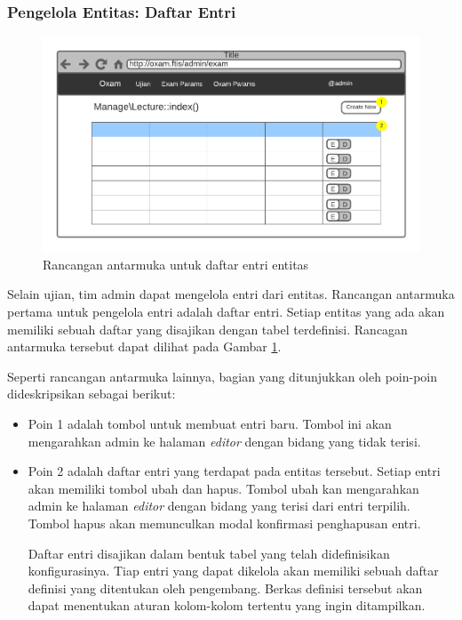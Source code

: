 \subsubsection{Pengelola Entitas: Daftar Entri}
    \begin{figure}
        \centering
        \includegraphics{Gambar/mockups/Mockup--Admin - Entity Lister.pdf}
        \caption{Rancangan antarmuka untuk daftar entri entitas}
        \label{fig:mockup_admin_entity_lister}
    \end{figure}
    Selain ujian, tim admin dapat mengelola entri dari entitas. Rancangan antarmuka pertama untuk 
    pengelola entri adalah daftar entri. Setiap entitas yang ada akan memiliki sebuah daftar yang 
    disajikan dengan tabel terdefinisi. Rancagan antarmuka tersebut dapat dilihat pada Gambar
    \ref{fig:mockup_admin_entity_lister}.
    
    Seperti rancangan antarmuka lainnya, bagian yang ditunjukkan oleh poin-poin dideskripsikan sebagai berikut:
    \begin{itemize}
        \item Poin 1 adalah tombol untuk membuat entri baru. Tombol ini akan mengarahkan admin
            ke halaman \textit{editor} dengan bidang yang tidak terisi.
            
        \item Poin 2 adalah daftar entri yang terdapat pada entitas tersebut. Setiap entri akan
            memiliki tombol ubah dan hapus. Tombol ubah kan mengarahkan admin ke halaman \textit{editor}
            dengan bidang yang terisi dari entri terpilih. Tombol hapus akan memunculkan modal konfirmasi
            penghapusan entri.
            
            Daftar entri disajikan dalam bentuk tabel yang telah didefinisikan konfigurasinya. Tiap entri
            yang dapat dikelola akan memiliki sebuah daftar definisi yang ditentukan oleh pengembang. Berkas
            definisi tersebut akan dapat menentukan aturan kolom-kolom tertentu yang ingin ditampilkan.
    \end{itemize}
    
